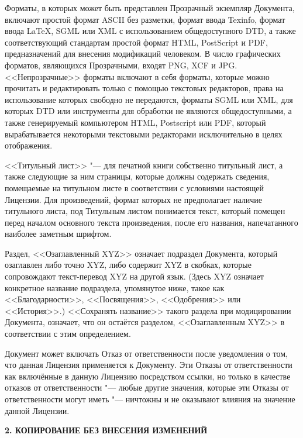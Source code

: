 Форматы, в которых может быть представлен Прозрачный экземпляр Документа,
включают простой формат ASCII без разметки, формат ввода Texinfo, формат
ввода LaTeX, SGML или XML с использованием общедоступного DTD, а также
соответствующий стандартам простой формат HTML, PostScript и PDF,
предназначений для внесения модификаций человеком. В число графических
форматов, являющихся Прозрачными, входят PNG, XCF и JPG. <<Непрозрачные>>
форматы включают в себя форматы, которые можно прочитать и редактировать
только с помощью текстовых редакторов, права на использование которых
свободно не передаются, форматы SGML или XML, для которых DTD или
инструменты для обработки не являются общедоступными, а также
генерируемый компьютером HTML, Postscript или PDF, который вырабатывается
некоторыми текстовыми редакторами исключительно в целях отображения.

<<Титульный лист>> "--- для печатной книги собственно титульный лист, а
также следующие за ним страницы, которые должны содержать сведения,
помещаемые на титульном листе в соответствии с условиями настоящей
Лицензии. Для произведений, формат которых не предполагает наличие
титульного листа, под Титульным листом понимается текст, который помещен
перед началом основного текста произведения, после его названия,
напечатанного наиболее заметным шрифтом.

Раздел, <<Озаглавленный XYZ>> означает подраздел Документа, который
озаглавлен либо точно XYZ, либо содержит XYZ в скобках, которые
сопровождают текст-перевод XYZ на другой язык. (Здесь XYZ означает
конкретное название подраздела, упомянутое ниже, такое как
<<Благодарности>>, <<Посвящения>>, <<Одобрения>> или <<История>>.)
<<Сохранять название>> такого раздела при модицировании Документа,
означает, что он остаётся разделом, <<Озаглавленным XYZ>> в соответствии
с этим определением.

Документ может включать Отказ от ответственности после уведомления о
том, что данная Лицензия применяется к Документу. Эти Отказы от
ответственности как включённые в данную Лицензию посредством ссылки, но
только в качестве отказов от ответственности "--- любые другие значения,
которые эти Отказы от ответственности могут иметь "--- ничтожны и не
оказывают влияния на значение данной Лицензии.


\begin{center}
{\Large\bf 2. КОПИРОВАНИЕ БЕЗ ВНЕСЕНИЯ ИЗМЕНЕНИЙ\par}
\end{center}

